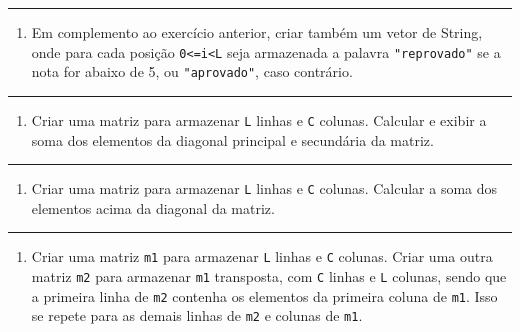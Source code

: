 \documentclass[12pt,a4paper]{article}
\providecommand{\tightlist}{%
      \setlength{\itemsep}{0pt}\setlength{\parskip}{0pt}}
\begin{document}
    \begin{center}\rule{0.5\linewidth}{0.5pt}\end{center}

\begin{enumerate}
\def\labelenumi{\arabic{enumi}.}
\setcounter{enumi}{1}
\tightlist
\item
  Em complemento ao exercício anterior, criar também um vetor de String,
  onde para cada posição \texttt{0\textless{}=i\textless{}L} seja
  armazenada a palavra \texttt{"reprovado"} se a nota for abaixo de 5,
  ou \texttt{"aprovado"}, caso contrário.
\end{enumerate}

    \begin{center}\rule{0.5\linewidth}{0.5pt}\end{center}

\begin{enumerate}
\def\labelenumi{\arabic{enumi}.}
\setcounter{enumi}{2}
\tightlist
\item
  Criar uma matriz para armazenar \texttt{L} linhas e \texttt{C}
  colunas. Calcular e exibir a soma dos elementos da diagonal principal
  e secundária da matriz.
\end{enumerate}

    \begin{center}\rule{0.5\linewidth}{0.5pt}\end{center}

\begin{enumerate}
\def\labelenumi{\arabic{enumi}.}
\setcounter{enumi}{3}
\tightlist
\item
  Criar uma matriz para armazenar \texttt{L} linhas e \texttt{C}
  colunas. Calcular a soma dos elementos acima da diagonal da matriz.
\end{enumerate}

    \begin{center}\rule{0.5\linewidth}{0.5pt}\end{center}

\begin{enumerate}
\def\labelenumi{\arabic{enumi}.}
\setcounter{enumi}{4}
\tightlist
\item
  Criar uma matriz \texttt{m1} para armazenar \texttt{L} linhas e
  \texttt{C} colunas. Criar uma outra matriz \texttt{m2} para armazenar
  \texttt{m1} transposta, com \texttt{C} linhas e \texttt{L} colunas,
  sendo que a primeira linha de \texttt{m2} contenha os elementos da
  primeira coluna de \texttt{m1}. Isso se repete para as demais linhas
  de \texttt{m2} e colunas de \texttt{m1}.
\end{enumerate}
\end{document}
